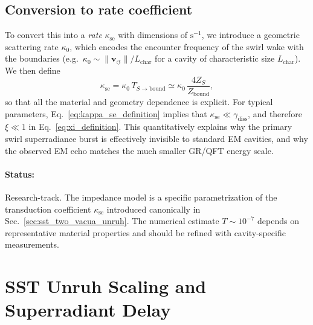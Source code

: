 \documentclass[10pt,reprint,aps,onecolumn,nofootinbib]{revtex4-2}
\newcommand{\vswirl}{\mathbf{v}_{\!\boldsymbol{\circlearrowleft}}}
\begin{document}
\subsection{Conversion to rate coefficient}

    To convert this into a \emph{rate} $\kappa_{\text{se}}$ with dimensions of
    $\mathrm{s}^{-1}$, we introduce a geometric scattering rate $\kappa_0$,
    which encodes the encounter frequency of the swirl wake with the boundaries
    (e.g.\ $\kappa_0 \sim \lVert\vswirl\rVert/L_{\mathrm{char}}$ for a cavity of
    characteristic size $L_{\mathrm{char}}$). We then define
    \begin{equation}
        \kappa_{\text{se}}
        =
        \kappa_0\, T_{S\to \mathrm{bound}}
        \simeq
        \kappa_0\,\frac{4 Z_S}{Z_{\mathrm{bound}}},
        \label{eq:kappa_se_definition}
    \end{equation}
    so that all the material and geometry dependence is explicit. For typical
    parameters, Eq.~\eqref{eq:kappa_se_definition} implies that
    $\kappa_{\text{se}} \ll \gamma_{\mathrm{diss}}$, and therefore
    $\xi \ll 1$ in Eq.~\eqref{eq:xi_definition}. This quantitatively explains
    why the primary swirl superradiance burst is effectively invisible to standard
    EM cavities, and why the observed EM echo matches the much smaller GR/QFT
    energy scale.

    \paragraph*{Status:} Research-track. The impedance model is a specific
        parametrization of the transduction coefficient $\kappa_{\text{se}}$ introduced
        canonically in Sec.~\ref{sec:sst_two_vacua_unruh}. The numerical estimate
        $T \sim 10^{-7}$ depends on representative material properties and should be
        refined with cavity-specific measurements.


\section{SST Unruh Scaling and Superradiant Delay}
\end{document}
